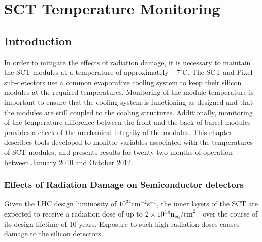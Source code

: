 \graphicspath{{Chapters/SCT/Figures/}}

\chapter{SCT Temperature Monitoring}
\label{chap:SCT}

\section{Introduction}

In order to mitigate the effects of radiation damage, it is necessary to
maintain the SCT modules at a temperature of approximately $-7^{\circ}$C. The
SCT and Pixel sub-detectors use a common evaporative cooling system to keep
their silicon modules at the required temperatures. Monitoring of the module
temperature is important to ensure that the cooling system is functioning as
designed and that the modules are still coupled to the cooling structures.
Additionally, monitoring of the temperature difference between the front and the
back of barrel modules provides a check of the mechanical integrity of the
modules. This
chapter describes tools developed to monitor variables associated with the
temperatures of SCT modules, and presents results for twenty-two months of
operation between January 2010 and October 2012.



\subsection{Effects of Radiation Damage on Semiconductor detectors}
Given the LHC design luminosity of $10^{34}$cm$^{-2}$s$^{-1}$, the
inner layers of the 
SCT are expected to receive a radiation dose of up to
$2\times10^{14}\rm{n_{eq}/cm}^2$~\cite{Ahmad200798} over the course of its design
lifetime of 10 years.
Exposure to such high radiation doses causes damage to the silicon detectors. 

